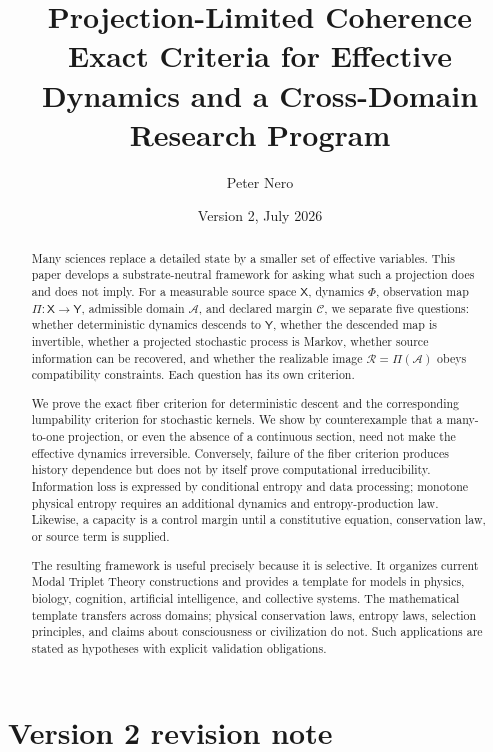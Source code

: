 \documentclass[11pt]{article}
\title{\textbf{Projection-Limited Coherence}\\
\large Exact Criteria for Effective Dynamics and a Cross-Domain Research Program}
\author{Peter Nero}
\date{Version 2, July 2026}
\newcommand{\X}{\mathsf X}
\newcommand{\Y}{\mathsf Y}
\newcommand{\A}{\mathcal A}
\newcommand{\Rset}{\mathcal R}
\newcommand{\Ccap}{\mathcal C}
\begin{document}
\maketitle

\begin{abstract}
Many sciences replace a detailed state by a smaller set of effective
variables.  This paper develops a substrate-neutral framework for asking
what such a projection does and does not imply.  For a measurable source
space $\X$, dynamics $\Phi$, observation map $\Pi:\X\to\Y$, admissible
domain $\A$, and declared margin $\Ccap$, we separate five questions:
whether deterministic dynamics descends to $\Y$, whether the descended map
is invertible, whether a projected stochastic process is Markov, whether
source information can be recovered, and whether the realizable image
$\Rset=\Pi(\A)$ obeys compatibility constraints.  Each question has its own
criterion.

We prove the exact fiber criterion for deterministic descent and the
corresponding lumpability criterion for stochastic kernels.  We show by
counterexample that a many-to-one projection, or even the absence of a
continuous section, need not make the effective dynamics irreversible.
Conversely, failure of the fiber criterion produces history dependence but
does not by itself prove computational irreducibility.  Information loss is
expressed by conditional entropy and data processing; monotone physical
entropy requires an additional dynamics and entropy-production law.
Likewise, a capacity is a control margin until a constitutive equation,
conservation law, or source term is supplied.

The resulting framework is useful precisely because it is selective.  It
organizes current Modal Triplet Theory constructions and provides a template
for models in physics, biology, cognition, artificial intelligence, and
collective systems.  The mathematical template transfers across domains;
physical conservation laws, entropy laws, selection principles, and claims
about consciousness or civilization do not.  Such applications are stated
as hypotheses with explicit validation obligations.
\end{abstract}

\section*{Version 2 revision note}
\end{document}
